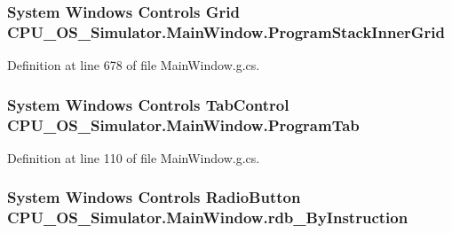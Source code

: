 \subsubsection[{Program\+Stack\+Inner\+Grid}]{\setlength{\rightskip}{0pt plus 5cm}System Windows Controls Grid C\+P\+U\+\_\+\+O\+S\+\_\+\+Simulator.\+Main\+Window.\+Program\+Stack\+Inner\+Grid\hspace{0.3cm}{\ttfamily [package]}}\label{class_c_p_u___o_s___simulator_1_1_main_window_a8c373866c86f6be0e7ef487a5ccb8c3c}


Definition at line 678 of file Main\+Window.\+g.\+cs.

\hypertarget{class_c_p_u___o_s___simulator_1_1_main_window_a615ea960969aa9a61afdaef8cf039348}{}
\subsubsection[{Program\+Tab}]{\setlength{\rightskip}{0pt plus 5cm}System Windows Controls Tab\+Control C\+P\+U\+\_\+\+O\+S\+\_\+\+Simulator.\+Main\+Window.\+Program\+Tab\hspace{0.3cm}{\ttfamily [package]}}\label{class_c_p_u___o_s___simulator_1_1_main_window_a615ea960969aa9a61afdaef8cf039348}


Definition at line 110 of file Main\+Window.\+g.\+cs.

\hypertarget{class_c_p_u___o_s___simulator_1_1_main_window_acba6218f7f716645443533815c6bd7a3}{}
\subsubsection[{rdb\+\_\+\+By\+Instruction}]{\setlength{\rightskip}{0pt plus 5cm}System Windows Controls Radio\+Button C\+P\+U\+\_\+\+O\+S\+\_\+\+Simulator.\+Main\+Window.\+rdb\+\_\+\+By\+Instruction\hspace{0.3cm}{\ttfamily [package]}}\label{class_c_p_u___o_s___simulator_1_1_main_window_acba6218f7f716645443533815c6bd7a3}


